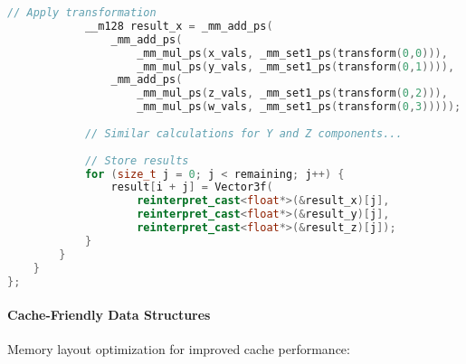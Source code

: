 \begin{lstlisting}[language=C++, caption=SIMD-Optimized Matrix Operations]
            // Apply transformation
            __m128 result_x = _mm_add_ps(
                _mm_add_ps(
                    _mm_mul_ps(x_vals, _mm_set1_ps(transform(0,0))),
                    _mm_mul_ps(y_vals, _mm_set1_ps(transform(0,1)))),
                _mm_add_ps(
                    _mm_mul_ps(z_vals, _mm_set1_ps(transform(0,2))),
                    _mm_mul_ps(w_vals, _mm_set1_ps(transform(0,3)))));
            
            // Similar calculations for Y and Z components...
            
            // Store results
            for (size_t j = 0; j < remaining; j++) {
                result[i + j] = Vector3f(
                    reinterpret_cast<float*>(&result_x)[j],
                    reinterpret_cast<float*>(&result_y)[j],
                    reinterpret_cast<float*>(&result_z)[j]);
            }
        }
    }
};
\end{lstlisting}

\paragraph{Cache-Friendly Data Structures}

Memory layout optimization for improved cache performance:

